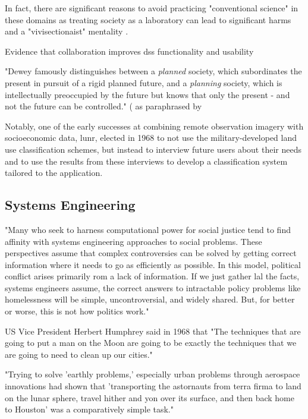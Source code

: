 In fact, there are significant reasons to avoid practicing "conventional science" in these domains as treating society as a laboratory can lead to significant harms and a "vivisectionaist" mentality \cite{banandynuriModernMedicineIts1990}.

Evidence that collaboration improves \ac{dss} functionality and usability \cite{goodspeedDeathLifeCollaborative2016, vonkSociotechnicalPSSDevelopment2010, brommelstroetPlanningSupportSystems2010a, ulibarriCollaborativeModelDevelopment2018} 

"Dewey famously distinguishes between a \textit{planned} society, which subordinates the present in pursuit of a rigid planned future, and a \textit{planning} society, which is intellectually preoccupied by the future but knows that only the present - and not the future can be controlled." (\cite{deweyHumanNatureConduct2007} as paraphrased by \cite{goodspeedScenarioPlanningCities2020}

Notably, one of the early successes at combining remote observation imagery with socioeconomic data, \ac{lunr}, elected in 1968 to not use the military-developed land use classification schemes, but instead to interview future users about their needs and to use the results from these interviews to develop a classification system tailored to the application. 

\subsection{Systems Engineering}


"Many who seek to harness computational power for social justice tend to find affinity with systems engineering approaches to social problems. These perspectives assume that complex controversies can be solved by getting correct information where it needs to go as efficiently as possible. In this model, political conflict arises primarily rom a lack of information. If we just gather lal the facts, systems engineers assume, the correct answers to intractable policy problems like homelessness will be simple, uncontroversial, and widely shared. But, for better or worse, this is not how politics work." \cite{eubanksAutomatingInequalityHow2018}

US Vice President Herbert Humphrey said in 1968 that "The techniques that are going to put a man on the Moon are going to be exactly the techniques that we are going to need to clean up our cities." \cite{lightWarfareWelfareDefense2005}

"Trying to solve 'earthly problems,' especially urban problems through aerospace innovations had shown that 'transporting the astornauts from terra firma to land on the lunar sphere, travel hither and yon over its surface, and then back home to Houston' was a comparatively simple task." \cite{lightWarfareWelfareDefense2005}

